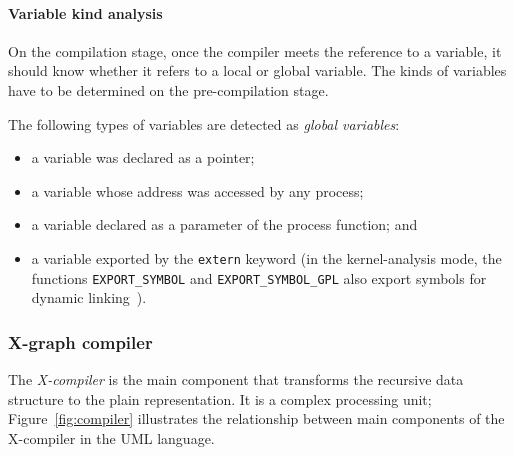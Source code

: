 

\paragraph{Variable kind analysis}

On the compilation stage, once the compiler meets the reference to a variable, it should know whether it refers to a local or global variable.
The kinds of variables have to be determined on the pre-compilation stage.

The following types of variables are detected as \textit{global variables}:
\begin{itemize}[noitemsep,topsep=0pt]
\item a variable was declared as a pointer;
\item a variable whose address was accessed by any process;
\item a variable declared as a parameter of the process function; and
\item a variable exported by the \texttt{extern} keyword (in the kernel-analysis mode, the functions \lstinline{EXPORT_SYMBOL} and \lstinline{EXPORT_SYMBOL_GPL} also export symbols for dynamic linking~\cite{argawal16kernel}).
\end{itemize}


\subsubsection{X-graph compiler}
\label{ch:impl:proc:x-compiler}

The \textit{X-compiler} is the main component that transforms the recursive \ytree{} data structure to the plain \xgraph{} representation.
It is a complex processing unit; Figure~\ref{fig:compiler} illustrates the relationship between main components of the X-compiler in the UML language.

